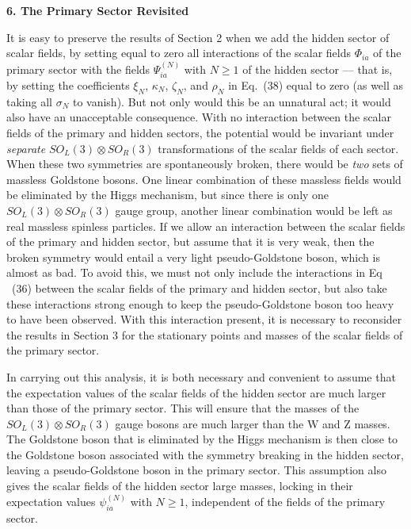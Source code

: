 \begin{center}
{\bf 6.  The Primary Sector Revisited}
\end{center}

It is easy to  preserve  the results of Section 2 when we add the hidden sector of scalar fields, by setting equal to zero all interactions of the scalar fields $\Phi_{ia}$ of the primary sector with the fields $\Psi^{(N)}_{ia}$ with $N\geq 1$ of the hidden sector --- that is, by setting the coefficients $\xi_N$, $\kappa_N$, $\zeta_N$, and $\rho_N$ in Eq.~(38) equal to zero (as well as taking all $\sigma_{N}$ to vanish).  But not only would this be an unnatural act; it would also have an unacceptable consequence.  With no interaction between the scalar fields of the primary and hidden sectors, the potential would be invariant under  {\em separate}   $SO_L(3)\otimes SO_R(3)$ transformations of the scalar fields of each sector.  When these two symmetries are spontaneously broken, there would be {\em two} sets of massless Goldstone bosons.  One linear combination of these massless fields would be eliminated by the Higgs mechanism, but since there is only one $SO_L(3)\otimes SO_R(3)$ gauge group, another linear combination would be left  as real massless spinless particles.  If we allow an interaction between the scalar fields of the primary and hidden sector, but assume that it is very weak, then the broken symmetry would entail a very light pseudo-Goldstone boson, which is almost as bad.  To avoid this, we must not only include the interactions in Eq ~(36) between the scalar fields of the primary and hidden sector, but also take these interactions strong enough to keep the pseudo-Goldstone boson too heavy to have been observed.  With this interaction present, it is necessary to reconsider the results in Section 3 for  the stationary points and masses of the scalar fields of the primary sector.

In carrying out this analysis, it is both necessary and convenient to assume that the expectation values of the scalar fields of the hidden sector are much larger than those of the primary sector.  This will ensure that the masses of the $SO_L(3)\otimes SO_R(3)$ gauge bosons are much larger than the W and Z masses.  The Goldstone boson that is eliminated by the Higgs mechanism is then close to the Goldstone boson associated with the symmetry breaking in the hidden sector, leaving a pseudo-Goldstone boson in the primary sector.  This assumption also gives the scalar fields of the hidden sector large masses, locking in their expectation values $\psi^{(N)}_{ia}$ with $N\geq 1$, independent of the fields of the primary sector.  

